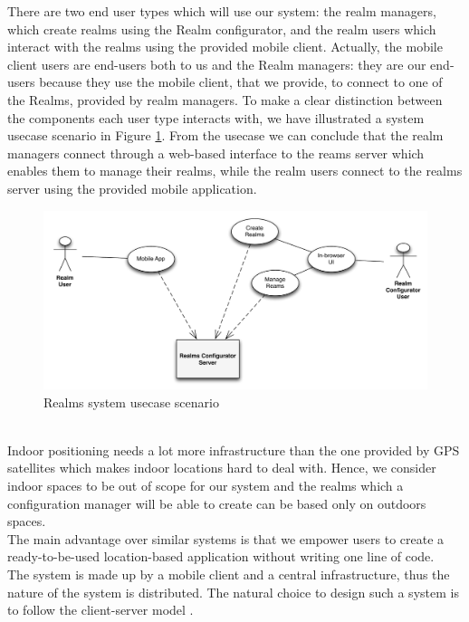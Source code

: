 \noindent There are two end user types which will use our system: the realm managers, which create realms using the Realm configurator, and the realm users which interact with the realms using the provided mobile client. Actually, the mobile client users are end-users both to us and the Realm managers: they are our end-users because they use the mobile client, that we provide, to connect to one of the Realms, provided by realm managers. To make a clear distinction between the components each user type interacts with, we have illustrated a system usecase scenario in Figure \ref{fig.system_usecase}. From the usecase we can conclude that the realm managers connect through a web-based interface to the reams server which enables them to manage their realms, while the realm users connect to the realms server using the provided mobile application.
\begin{figure}
	\centering
	\includegraphics[width=1.0\linewidth]{fig/system_use_usecase}
	\caption{Realms system usecase scenario}
	\label{fig.system_usecase}
\end{figure}
\\

\noindent Indoor positioning needs a lot more infrastructure than the one provided by GPS satellites which makes indoor locations hard to deal with. Hence, we consider indoor spaces to be out of scope for our system and the realms which a configuration manager will be able to create can be based only on outdoors spaces.
\\

\noindent The main advantage over similar systems is that we empower users to create a ready-to-be-used location-based application without writing one line of code.
\\

\noindent The system is made up by a mobile client and a central infrastructure, thus the nature of the system is distributed. The natural choice to design such a system is to follow the client-server model \cite{Coulouris:2005}.
\\

